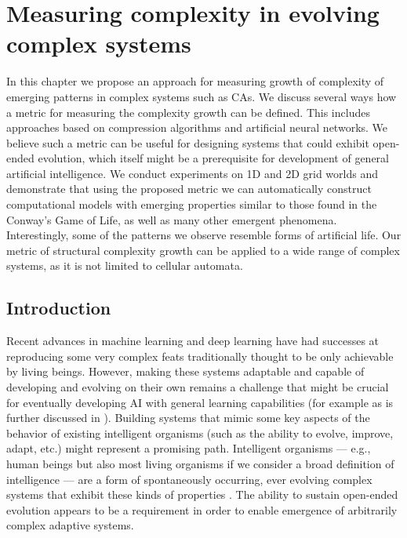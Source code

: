 \chapter{Measuring complexity in evolving complex systems}
\label{cha:meas-compl-evolv}

In this chapter we propose an approach for measuring growth of complexity of
emerging patterns in complex systems such as \acfp{CA}. We discuss
several ways how a metric for measuring the complexity growth can be defined.
This includes approaches based on compression algorithms and artificial neural
networks. We believe such a metric can be useful for designing systems that
could exhibit open-ended evolution, which itself might be a prerequisite for
development of general artificial intelligence. We conduct experiments on 1D and
2D grid worlds and demonstrate that using the proposed metric we can
automatically construct computational models with emerging properties similar to
those found in the Conway's Game of Life, as well as many other emergent
phenomena. Interestingly, some of the patterns we observe resemble forms of
artificial life. Our metric of structural complexity growth can be applied to a
wide range of complex systems, as it is not limited to cellular automata.

\section{Introduction}
Recent advances in machine learning and deep learning have had successes at
reproducing some very complex feats traditionally thought to be only achievable
by living beings. However, making these systems adaptable and capable of
developing and evolving on their own remains a challenge that might be crucial
for eventually developing AI with general learning capabilities (for example as
is further discussed in \parencite{mikolovRoadmapMachineIntelligence2018}).
Building systems that mimic some key aspects of the behavior of existing
intelligent organisms (such as the ability to evolve, improve, adapt, etc.)
might represent a promising path. Intelligent organisms --- e.g., human beings but
also most living organisms if we consider a broad definition of intelligence ---
are a form of spontaneously occurring, ever evolving complex systems that
exhibit these kinds of properties
\parencite{bookerPerspectivesAdaptationNatural2004}. The ability to sustain
open-ended evolution appears to be a requirement in order to enable emergence of
arbitrarily complex adaptive systems.

